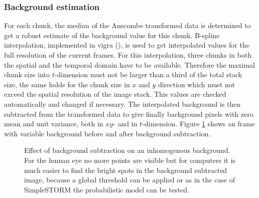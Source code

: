 \subsubsection{Background estimation} \label{bgestimation}
For each chunk, the median of the Anscombe transformed data is determined to get a robust estimate of the background value for this chunk. 
B-spline interpolation, implemented in vigra (\cite{vigra}), is used to get interpolated values for the full resolution of the current frames. For this interpolation, three chunks in both the spatial and the temporal domain have to be available. Therefore the maximal chunk size into $t$-dimension must not be larger than a third of the total stack size, the same holds for the chunk size in $x$ and $y$ direction which must not exceed the spatial resolution of the image stack. This values are checked automatically and changed if necessary.\newline
The interpolated background is then subtracted from the transformed data to give finally background pixels with zero mean and unit variance, both in $xy$- and in $t$-dimension. Figure \ref{removedBG} shows an frame with variable background before and after background subtraction.
\begin{figure}
\hfill
{}
	\caption{Effect of background subtraction on an inhomogenous background. For the human eye no more points are visible but for computers it is much easier to find the bright spots in the background subtracted image, because a global threshold can be applied or as in the case of SimpleSTORM the probabilistic model can be tested.}
	\label{removedBG}	
\end{figure}
